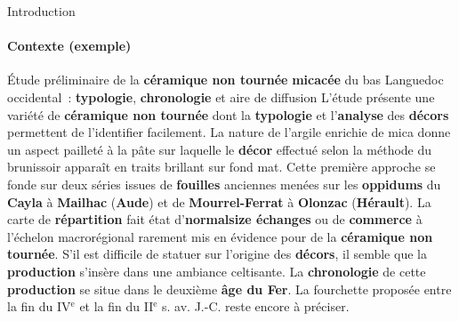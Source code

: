 \begin{frame}{Introduction}\framesubtitle{Contexte (exemple)}
  \begin{exampleblock}{\small
    Étude préliminaire de la \textbf{\normalsize céramique non tournée}
    \textbf{\normalsize micacée} du bas Languedoc occidental~:
    \textbf{\normalsize typologie}, \textbf{\normalsize chronologie} et aire de
    diffusion
  }\justifying\small
    L'étude présente une variété de \textbf{\normalsize céramique non tournée}
    dont la \textbf{\normalsize typologie} et l'\textbf{\normalsize analyse} des
    \textbf{\normalsize décors} permettent de l'identifier facilement. La nature
    de l'argile enrichie de mica donne un aspect pailleté à la pâte sur laquelle
    le \textbf{\normalsize décor} effectué selon la méthode du brunissoir
    apparaît en traits brillant sur fond mat. Cette première approche se fonde
    sur deux séries issues de \textbf{\normalsize fouilles} anciennes menées sur
    les \textbf{\normalsize oppidums} du \textbf{\normalsize Cayla} à
    \textbf{\normalsize Mailhac} (\textbf{\normalsize Aude}) et de
    \textbf{\normalsize Mourrel-Ferrat} à \textbf{\normalsize Olonzac}
    (\textbf{\normalsize Hérault}). La carte de \textbf{\normalsize répartition}
    fait état d'\textbf{normalsize échanges} ou de \textbf{\normalsize commerce}
    à l'échelon macrorégional rarement mis en évidence pour de la
    \textbf{\normalsize céramique non tournée}. S'il est difficile de statuer
    sur l'origine des \textbf{\normalsize décors}, il semble que la
    \textbf{\normalsize production} s'insère dans une ambiance celtisante. La
    \textbf{\normalsize chronologie} de cette \textbf{\normalsize production} se
    situe dans le deuxième \textbf{\normalsize âge du Fer}. La fourchette
    proposée entre la fin du IV$^\text{e}$ et la fin du II$^\text{e}$ s. av.
    J.-C. reste encore à préciser.
  \end{exampleblock}
\end{frame}

